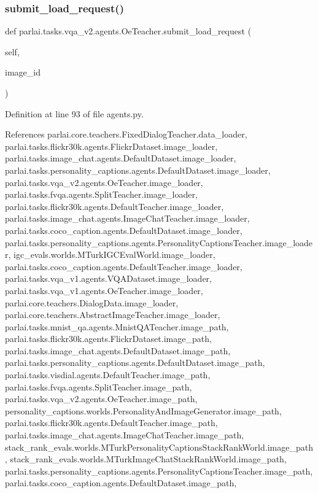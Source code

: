 \subsubsection{\texorpdfstring{submit\+\_\+load\+\_\+request()}{submit\_load\_request()}}
{\footnotesize\ttfamily def parlai.\+tasks.\+vqa\+\_\+v2.\+agents.\+Oe\+Teacher.\+submit\+\_\+load\+\_\+request (\begin{DoxyParamCaption}\item[{}]{self,  }\item[{}]{image\+\_\+id }\end{DoxyParamCaption})}



Definition at line 93 of file agents.\+py.



References parlai.\+core.\+teachers.\+Fixed\+Dialog\+Teacher.\+data\+\_\+loader, parlai.\+tasks.\+flickr30k.\+agents.\+Flickr\+Dataset.\+image\+\_\+loader, parlai.\+tasks.\+image\+\_\+chat.\+agents.\+Default\+Dataset.\+image\+\_\+loader, parlai.\+tasks.\+personality\+\_\+captions.\+agents.\+Default\+Dataset.\+image\+\_\+loader, parlai.\+tasks.\+vqa\+\_\+v2.\+agents.\+Oe\+Teacher.\+image\+\_\+loader, parlai.\+tasks.\+fvqa.\+agents.\+Split\+Teacher.\+image\+\_\+loader, parlai.\+tasks.\+flickr30k.\+agents.\+Default\+Teacher.\+image\+\_\+loader, parlai.\+tasks.\+image\+\_\+chat.\+agents.\+Image\+Chat\+Teacher.\+image\+\_\+loader, parlai.\+tasks.\+coco\+\_\+caption.\+agents.\+Default\+Dataset.\+image\+\_\+loader, parlai.\+tasks.\+personality\+\_\+captions.\+agents.\+Personality\+Captions\+Teacher.\+image\+\_\+loader, igc\+\_\+evals.\+worlds.\+M\+Turk\+I\+G\+C\+Eval\+World.\+image\+\_\+loader, parlai.\+tasks.\+coco\+\_\+caption.\+agents.\+Default\+Teacher.\+image\+\_\+loader, parlai.\+tasks.\+vqa\+\_\+v1.\+agents.\+V\+Q\+A\+Dataset.\+image\+\_\+loader, parlai.\+tasks.\+vqa\+\_\+v1.\+agents.\+Oe\+Teacher.\+image\+\_\+loader, parlai.\+core.\+teachers.\+Dialog\+Data.\+image\+\_\+loader, parlai.\+core.\+teachers.\+Abstract\+Image\+Teacher.\+image\+\_\+loader, parlai.\+tasks.\+mnist\+\_\+qa.\+agents.\+Mnist\+Q\+A\+Teacher.\+image\+\_\+path, parlai.\+tasks.\+flickr30k.\+agents.\+Flickr\+Dataset.\+image\+\_\+path, parlai.\+tasks.\+image\+\_\+chat.\+agents.\+Default\+Dataset.\+image\+\_\+path, parlai.\+tasks.\+personality\+\_\+captions.\+agents.\+Default\+Dataset.\+image\+\_\+path, parlai.\+tasks.\+visdial.\+agents.\+Default\+Teacher.\+image\+\_\+path, parlai.\+tasks.\+fvqa.\+agents.\+Split\+Teacher.\+image\+\_\+path, parlai.\+tasks.\+vqa\+\_\+v2.\+agents.\+Oe\+Teacher.\+image\+\_\+path, personality\+\_\+captions.\+worlds.\+Personality\+And\+Image\+Generator.\+image\+\_\+path, parlai.\+tasks.\+flickr30k.\+agents.\+Default\+Teacher.\+image\+\_\+path, parlai.\+tasks.\+image\+\_\+chat.\+agents.\+Image\+Chat\+Teacher.\+image\+\_\+path, stack\+\_\+rank\+\_\+evals.\+worlds.\+M\+Turk\+Personality\+Captions\+Stack\+Rank\+World.\+image\+\_\+path, stack\+\_\+rank\+\_\+evals.\+worlds.\+M\+Turk\+Image\+Chat\+Stack\+Rank\+World.\+image\+\_\+path, parlai.\+tasks.\+personality\+\_\+captions.\+agents.\+Personality\+Captions\+Teacher.\+image\+\_\+path, parlai.\+tasks.\+coco\+\_\+caption.\+agents.\+Default\+Dataset.\+image\+\_\+path, 
